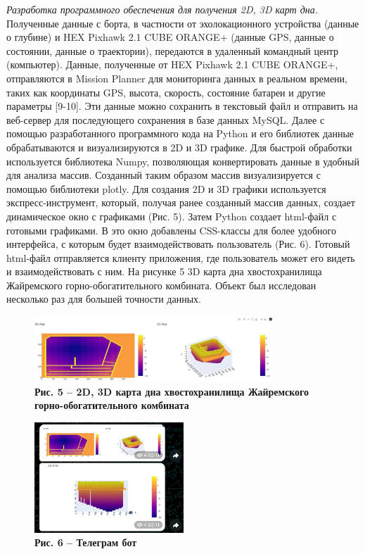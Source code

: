 \emph{Разработка программного обеспечения для получения 2D, 3D карт
дна.} Полученные данные с борта, в частности от эхолокационного
устройства (данные о глубине) и HEX Pixhawk 2.1 CUBE ORANGE+ (данные
GPS, данные о состоянии, данные о траектории), передаются в удаленный
командный центр (компьютер). Данные, полученные от HEX Pixhawk 2.1 CUBE
ORANGE+, отправляются в Mission Planner для мониторинга данных в
реальном времени, таких как координаты GPS, высота, скорость, состояние
батареи и другие параметры {[}9-10{]}. Эти данные можно сохранить в
текстовый файл и отправить на веб-сервер для последующего сохранения в
базе данных MySQL. Далее с помощью разработанного программного кода на
Python и его библиотек данные обрабатываются и визуализируются в 2D и 3D
графике. Для быстрой обработки используется библиотека Numpy,
позволяющая конвертировать данные в удобный для анализа массив.
Созданный таким образом массив визуализируется с помощью библиотеки
plotly. Для создания 2D и 3D графики используется экспресс-инструмент,
который, получая ранее созданный массив данных, создает динамическое
окно с графиками (Рис. 5). Затем Python создает html-файл с готовыми
графиками. В это окно добавлены CSS-классы для более удобного
интерфейса, с которым будет взаимодействовать пользователь (Рис. 6).
Готовый html-файл отправляется клиенту приложения, где пользователь
может его видеть и взаимодействовать с ним. На рисунке 5 3D карта дна
хвостохранилища Жайремского горно-обогатительного комбината. Объект был
исследован несколько раз для большей точности данных.

\begin{figure}[H]
	\centering
	\includegraphics[width=0.8\textwidth]{assets/212}
	\caption*{\bfseries Рис. 5 -- 2D, 3D карта дна хвостохранилища Жайремского
  горно-обогатительного комбината}
\end{figure}



\begin{figure}[H]
	\centering
	\includegraphics[width=0.5\textwidth]{assets/213}
	\caption*{\bfseries Рис. 6 -- Телеграм бот}
\end{figure}



